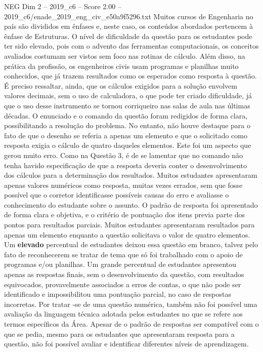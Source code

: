 \begin{textsample}{NEG Dim 2 – 2019\_c6 – Score 2.00 – 2019\_c6/enade\_2019\_eng\_civ\_e50a9f5296.txt}
Muitos cursos de Engenharia no país são divididos em ênfases e, neste caso, os conteúdos abordados pertencem à ênfase de Estruturas.
O nível de dificuldade da questão para os estudantes pode ter sido elevado, pois com o advento das ferramentas computacionais, os conceitos avaliados costumam ser vistos sem foco nas rotinas de cálculo.
Além disso, na prática da profissão, os engenheiros civis usam programas e planilhas muito conhecidos, que já trazem resultados como os esperados como resposta à questão.
É preciso ressaltar, ainda, que os cálculos exigidos para a solução envolvem valores decimais, sem o uso de calculadora, o que pode ter criado dificuldade, já que o uso desse instrumento se tornou corriqueiro nas salas de aula nas últimas décadas.
O enunciado e o comando da questão foram redigidos de forma clara, possibilitando a resolução do problema.
No entanto, não houve destaque para o fato de que o desenho se referia a apenas um elemento e que o solicitado como resposta exigia o cálculo de quatro daqueles elementos.
Este foi um aspecto que gerou muito erro.
Como na Questão 3, é de se lamentar que no comando não tenha havido especificação de que a resposta deveria conter o desenvolvimento dos cálculos para a determinação dos resultados.
Muitos estudantes apresentaram apenas valores numéricos como resposta, muitas vezes errados, sem que fosse possível que o corretor identificasse possíveis causas do erro e avaliasse o conhecimento do estudante sobre o assunto.
O padrão de resposta foi apresentado de forma clara e objetiva, e o critério de pontuação dos itens previa parte dos pontos para resultados parciais.
Muitos estudantes apresentaram resultados para apenas um elemento enquanto a questão solicitava o valor de quatro elementos.
Um \textbf{elevado} percentual de estudantes deixou essa questão em branco, talvez pelo fato de reconhecerem se tratar de tema que só foi trabalhado com o apoio de programas e/ou planilhas.
Um grande percentual de estudantes apresentou apenas as respostas finais, sem o desenvolvimento da questão, com resultados equivocados, provavelmente associados a erros de contas, o que não pode ser identificado e impossibilitou uma pontuação parcial, no caso de respostas incorretas.
Por tratar -se de uma questão numérica, também não foi possível uma avaliação da linguagem técnica adotada pelos estudantes no que se refere aos termos específicos da Área.
Apesar de o padrão de respostas ser compatível com o que se pedia, mesmo para os estudantes que apresentaram resposta para a questão, não foi possível avaliar e identificar diferentes níveis de aprendizagem.

\end{textsample}
